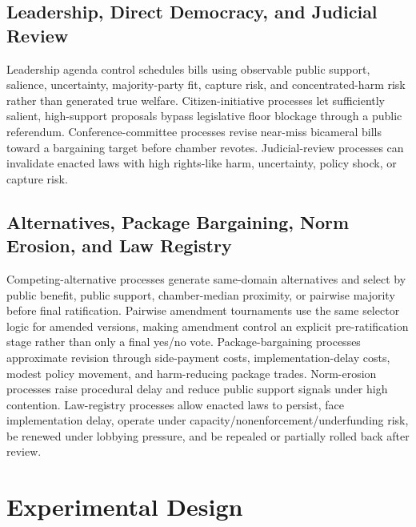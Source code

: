 \documentclass[manuscript]{acmart}
\begin{document}
\subsection{Leadership, Direct Democracy, and Judicial Review}

Leadership agenda control schedules bills using observable public support, salience, uncertainty, majority-party fit, capture risk, and concentrated-harm risk rather than generated true welfare. Citizen-initiative processes let sufficiently salient, high-support proposals bypass legislative floor blockage through a public referendum. Conference-committee processes revise near-miss bicameral bills toward a bargaining target before chamber revotes. Judicial-review processes can invalidate enacted laws with high rights-like harm, uncertainty, policy shock, or capture risk.

\subsection{Alternatives, Package Bargaining, Norm Erosion, and Law Registry}

Competing-alternative processes generate same-domain alternatives and select by public benefit, public support, chamber-median proximity, or pairwise majority before final ratification. Pairwise amendment tournaments use the same selector logic for amended versions, making amendment control an explicit pre-ratification stage rather than only a final yes/no vote. Package-bargaining processes approximate revision through side-payment costs, implementation-delay costs, modest policy movement, and harm-reducing package trades. Norm-erosion processes raise procedural delay and reduce public support signals under high contention. Law-registry processes allow enacted laws to persist, face implementation delay, operate under capacity/nonenforcement/underfunding risk, be renewed under lobbying pressure, and be repealed or partially rolled back after review.

\section{Experimental Design}
\end{document}
